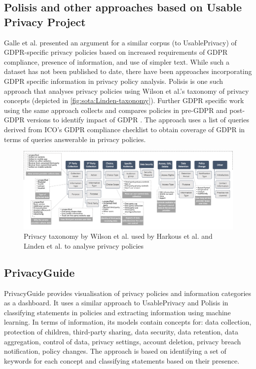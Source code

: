 \subsection*{Polisis and other approaches based on Usable Privacy Project}
Galle et al. \cite{galle_case_2019} presented an argument for a similar corpus (to UsablePrivacy) of GDPR-specific privacy policies based on increased requirements of GDPR compliance, presence of information, and use of simpler text. While such a dataset has not been published to date, there have been approaches incorporating GDPR specific information in privacy policy analysis.
Polisis \cite{harkous_polisis_2018} is one such approach that analyses privacy policies using Wilson et al.'s taxonomy of privacy concepts \cite{wilson_creation_2016} (depicted in \autoref{fig:sota:Linden-taxonomy}).
Further GDPR specific work using the same approach collects and compares policies in pre-GDPR and post-GDPR versions to identify impact of GDPR \cite{linden_privacy_2018}. The approach uses a list of queries derived from ICO’s GDPR compliance checklist to obtain coverage of GDPR in terms of queries answerable in privacy policies.
\begin{figure}[htbp]
    \centering
    \includegraphics[width=\linewidth]{img/Linden_taxonomy.png}
    \caption{Privacy taxonomy by Wilson et al. \cite{wilson_creation_2016} used by Harkous et al. \cite{harkous_polisis_2018} and Linden et al.  \cite{linden_privacy_2018} to analyse privacy policies}
    \label{fig:sota:Linden-taxonomy}
\end{figure}

\subsection*{PrivacyGuide}
PrivacyGuide \cite{tesfay_privacyguide_2018,westphal_spirit_2018} provides visualisation of privacy policies and information categories as a dashboard. It uses a similar approach to UsablePrivacy and Polisis in classifying statements in policies and extracting information using machine learning. In terms of information, its models contain concepts for: data collection, protection of children, third-party sharing, data security, data retention, data aggregation, control of data, privacy settings, account deletion, privacy breach notification, policy changes.
The approach is based on identifying a set of keywords for each concept and classifying statements based on their presence.

